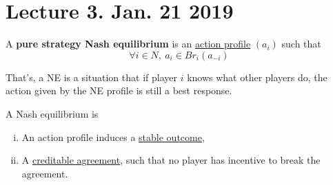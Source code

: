 \documentclass[11pt]{article}
\begin{document}
	\section{Lecture 3. Jan. 21 2019}
		\begin{definition}
			A \textbf{pure strategy Nash equilibrium} is an \ul{action profile} $(a_i)$ such that 
			\begin{equation}
				\forall i \in N,\ a_i \in Br_i(a_{-i})
			\end{equation}
		\end{definition}
			
		\begin{remark}
			That's, a NE is a situation that if player $i$ knows what other players do, the action given by the NE profile is still a best response.
		\end{remark}
		
		\begin{remark}[Interpretations]
			A Nash equilibrium is 
			\begin{enumerate}[i)]
				\item An action profile induces a \ul{stable outcome},
				\item A \ul{creditable agreement}, such that no player has incentive to break the agreement.
			\end{enumerate}
		\end{remark}
		
\end{document}
